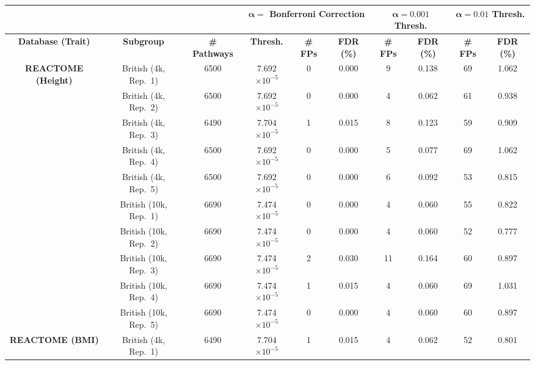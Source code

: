 \documentclass[10pt]{article}
\begin{document}

\begin{landscape}

\setlength{\extrarowheight}{3pt}

\begin{table}[ht]
\centering
\vspace*{-1.5cm}
\hspace*{-4em}
\begin{tabular}{|c|c|c|ccc|cc|cc|}
  \hline
& & & \multicolumn{3}{c|}{\textbf{$\bm{\alpha =}$ Bonferroni Correction}} & \multicolumn{2}{c|}{\textbf{$\bm{\alpha = 0.001}$ Thresh.}} & \multicolumn{2}{c|}{\textbf{$\bm{\alpha = 0.01}$ Thresh.}}\\
\hline
\textbf{Database (Trait)} & \textbf{Subgroup} & \textbf{\# Pathways} & \textbf{Thresh.} & \textbf{\# FPs} & \textbf{FDR (\%)} & \textbf{\# FPs} & \textbf{FDR (\%)} &  \textbf{\# FPs} & \textbf{FDR (\%)} \\ 
  \hline
\multirow{10.5}{*}{\textbf{REACTOME (Height)}} & British (4k, Rep.~1) & 6500 & 7.692$\times 10^{-5}$ & 0 & 0.000 & 9 & 0.138 & 69 & 1.062 \\
  & British (4k, Rep.~2) & 6500 & 7.692$\times 10^{-5}$ & 0 & 0.000 &  4 & 0.062 & 61 & 0.938 \\
  & British (4k, Rep.~3) & 6490 & 7.704$\times 10^{-5}$ & 1 & 0.015 & 8 & 0.123 & 59 & 0.909 \\
  & British (4k, Rep.~4) & 6500 & 7.692$\times 10^{-5}$ & 0 & 0.000 & 5 & 0.077 & 69 & 1.062 \\
  & British (4k, Rep.~5) & 6500 & 7.692$\times 10^{-5}$ & 0 & 0.000 & 6 & 0.092 & 53 & 0.815 \\
  & British (10k, Rep.~1) & 6690 & 7.474$\times 10^{-5}$ & 0 & 0.000 & 4 & 0.060 & 55 & 0.822 \\
  & British (10k, Rep.~2) & 6690 & 7.474$\times 10^{-5}$ & 0 & 0.000 & 4 & 0.060 & 52 & 0.777 \\
  & British (10k, Rep.~3) & 6690 & 7.474$\times 10^{-5}$ & 2 & 0.030 & 11 & 0.164 & 60 & 0.897 \\
  & British (10k, Rep.~4) & 6690 & 7.474$\times 10^{-5}$ & 1 & 0.015 & 4 & 0.060 & 69 & 1.031 \\
  & British (10k, Rep.~5) & 6690 & 7.474$\times 10^{-5}$ & 0 & 0.000 & 4 & 0.060 & 60 & 0.897 \\
   \hline
\multirow{10.5}{*}{\textbf{REACTOME (BMI)}} & British (4k, Rep.~1) & 6490 & 7.704$\times 10^{-5}$ & 1 & 0.015 & 4 & 0.062 & 52 & 0.801 \\

\end{tabular}
\end{table}
\end{landscape}
\end{document}
